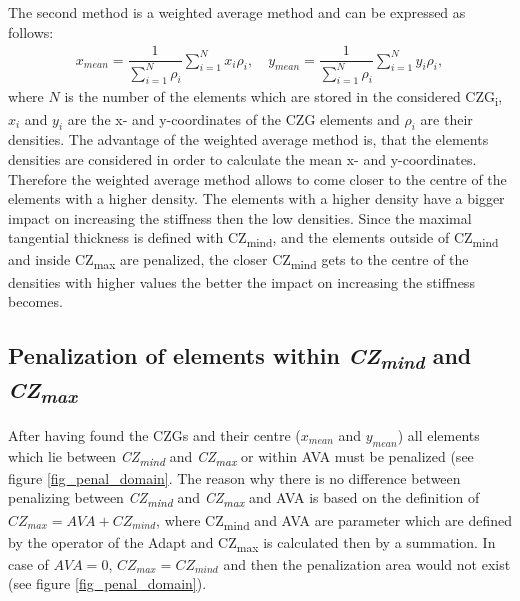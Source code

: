        The second method is a weighted average method and can be expressed
       as follows:
          \begin{align*}
       x_{mean} = \dfrac{1}{\sum_{i=1}^N \rho_i} \sum_{i=1}^N x_i  \rho_i, \quad 
       y_{mean} = \dfrac{1}{\sum_{i=1}^N \rho_i} \sum_{i=1}^N y_i \rho_i,
       \end{align*}
		where \textbf{$N$} is the number of the elements which are stored
       in the considered CZG\textsubscript{i},
        \textbf{$x_i$} and \textbf{$y_i$} are the x- and 
       y-coordinates of the CZG elements and \textbf{$\rho_i$} are their
       densities.
       The advantage of the weighted average method is, that the elements 
       densities are considered in order to calculate the mean x- and y-coordinates.
       Therefore the weighted average method allows to come
       closer to the centre of the elements with a higher density. The
       elements with a higher density have a bigger impact on increasing
       the stiffness then the low densities. Since the
       maximal tangential thickness is defined with CZ\textsubscript{mind},
       and the elements outside of CZ\textsubscript{mind} and
       inside CZ\textsubscript{max} are penalized,
       the closer CZ\textsubscript{mind} gets to the centre of the
       densities with higher values the better the impact
       on increasing the stiffness becomes. 
      
       \subsection{Penalization of elements within\textit{ CZ\textsubscript{mind}} and \textit{CZ\textsubscript{max}}}
       \label{subsection_distance_i}
       
       After having found the CZGs and their centre ($x_{mean}$ and $y_{mean}$)
       all elements which
       lie between \textit{CZ\textsubscript{mind}} and
        \textit{CZ\textsubscript{max}}
        or within AVA
       must be penalized (see figure \ref{fig_penal_domain}. The
       reason why there is no difference between penalizing
       between \textit{CZ\textsubscript{mind}} and
        \textit{CZ\textsubscript{max}} and AVA is based
        on the definition of
        $CZ_{max} = AVA + CZ_{mind}$, where
        CZ\textsubscript{mind} and AVA are
        parameter which are defined by the operator of
        the Adapt and CZ\textsubscript{max} is calculated
        then by a summation. In case of $AVA = 0$,
        $CZ_{max} = CZ_{mind}$ and then the penalization area
        would not exist (see figure
        \ref{fig_penal_domain}).\\

